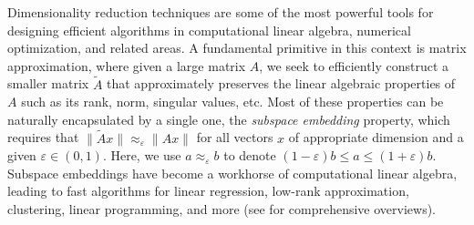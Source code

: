 \documentclass[11pt]{amsart}
\numberwithin{equation}{section}
\numberwithin{equation}{section}
\begin{document}
Dimensionality reduction techniques are some of the most powerful tools for designing efficient algorithms in computational linear algebra, numerical optimization, and related areas. A fundamental primitive in this context is matrix approximation, where given a large matrix $A$, we seek to efficiently construct a smaller matrix $\tilde A$ that approximately preserves the linear algebraic properties of $A$ such as its rank, norm, singular values, etc. Most of these properties can be naturally encapsulated by a single one, the \emph{subspace embedding} property, which requires that $\|\tilde Ax\|\approx_\varepsilon\|Ax\|$ for all vectors $x$ of appropriate dimension and a given $\varepsilon\in(0,1)$. Here, we use $a\approx_\varepsilon b$ to denote $(1-\varepsilon)b\leq a\leq (1+\varepsilon)b$. Subspace embeddings have become a workhorse of computational linear algebra, leading to fast algorithms for linear regression, low-rank approximation, clustering, linear programming, and more (see \cite{woodruff2014sketching,martinsson2020randomized,randlapack_book,derezinski2024recent} for comprehensive overviews).
\end{document}
